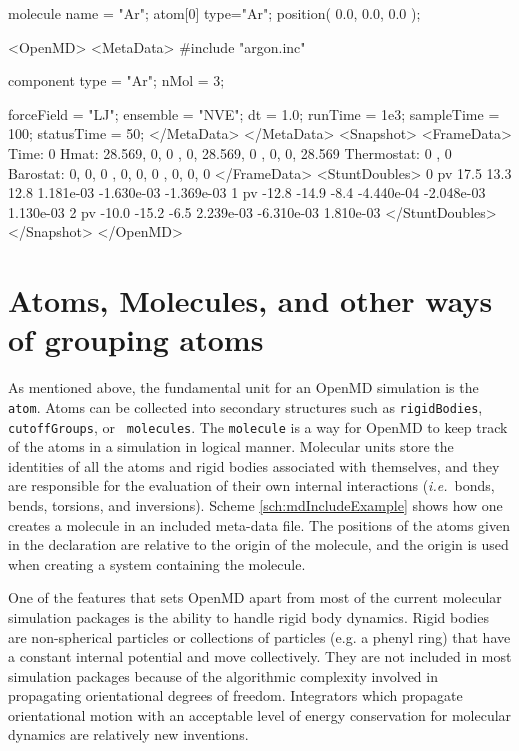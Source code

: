 \documentclass[letterpaper]{report}
\begin{document}
\begin{code}[caption={An example molecule definition in an
include file.},label={sch:mdIncludeExample}]
molecule{
  name = "Ar";
  atom[0]{
    type="Ar";
    position( 0.0, 0.0, 0.0 );
  }
}
\end{code}

\begin{code}[caption={Revised OpenMD input file
example.},label={sch:mdExPrime}]
<OpenMD>
  <MetaData>
#include "argon.inc"

component{
  type = "Ar";
  nMol = 3;
}

forceField = "LJ";
ensemble = "NVE";
dt = 1.0;
runTime = 1e3;
sampleTime = 100;
statusTime = 50; 
  </MetaData>
  </MetaData>
  <Snapshot>
    <FrameData>
        Time: 0
        Hmat: {{ 28.569, 0, 0 }, { 0, 28.569, 0 }, { 0, 0, 28.569 }}
  Thermostat: 0 , 0
    Barostat: {{ 0, 0, 0 }, { 0, 0, 0 }, { 0, 0, 0 }}
    </FrameData>
    <StuntDoubles>
         0      pv   17.5  13.3 12.8  1.181e-03 -1.630e-03 -1.369e-03
         1      pv  -12.8 -14.9 -8.4 -4.440e-04 -2.048e-03  1.130e-03
         2      pv  -10.0 -15.2 -6.5  2.239e-03 -6.310e-03  1.810e-03
    </StuntDoubles>
  </Snapshot>
</OpenMD>
\end{code}

\section{\label{section:atomsMolecules}Atoms, Molecules, and other
ways of grouping atoms}

As mentioned above, the fundamental unit for an OpenMD
simulation is the {\tt atom}.  Atoms can be collected into secondary
structures such as {\tt rigidBodies}, {\tt cutoffGroups}, or {\tt
  molecules}. The {\tt molecule} is a way for OpenMD to keep
track of the atoms in a simulation in logical manner. Molecular units
store the identities of all the atoms and rigid bodies associated with
themselves, and they are responsible for the evaluation of their own
internal interactions (\emph{i.e.}~bonds, bends, torsions, and
inversions). Scheme \ref{sch:mdIncludeExample} shows how one creates a
molecule in an included meta-data file. The positions of the atoms
given in the declaration are relative to the origin of the molecule,
and the origin is used when creating a system containing the molecule.

One of the features that sets OpenMD apart from most of the
current molecular simulation packages is the ability to handle rigid
body dynamics. Rigid bodies are non-spherical particles or collections
of particles (e.g. a phenyl ring) that have a constant internal
potential and move collectively.\cite{Goldstein01} They are not
included in most simulation packages because of the algorithmic
complexity involved in propagating orientational degrees of freedom.
Integrators which propagate orientational motion with an acceptable
level of energy conservation for molecular dynamics are relatively new
inventions.
\end{document}
